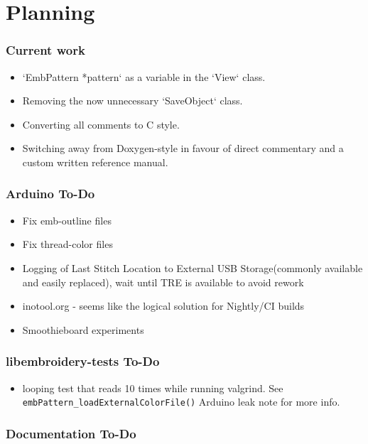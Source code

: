 
\chapter{Planning}

\subsection{Current work}

\begin{itemize}
\item `EmbPattern *pattern` as a variable in the `View` class.
\item Removing the now unnecessary `SaveObject` class.
\item Converting all comments to C style.
\item Switching away from Doxygen-style in favour of direct commentary and a custom written reference manual.
\end{itemize}

\subsection{Arduino To-Do}

\begin{itemize}
\item Fix emb-outline files
\item Fix thread-color files
\item Logging of Last Stitch Location to External USB Storage(commonly available and easily replaced), wait until TRE is available to avoid rework
\item inotool.org - seems like the logical solution for Nightly/CI builds
\item Smoothieboard experiments
\end{itemize}

\subsection{libembroidery-tests To-Do}

\begin{itemize}
\item looping test that reads 10 times while running valgrind. See \texttt{embPattern\_loadExternalColorFile()} Arduino leak note for more info.
\end{itemize}

\subsection{Documentation To-Do}

